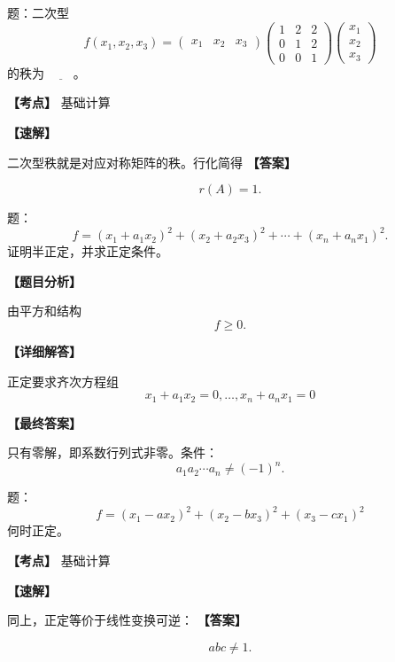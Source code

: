 ﻿\documentclass[11pt,a4paper,UTF8]{ctexart}
\begin{document}
\begin{answerbox}[2020--2021 填空 6]
题：二次型
\[
f(x_1,x_2,x_3)=
\begin{pmatrix}x_1&x_2&x_3\end{pmatrix}
\begin{pmatrix}
1&2&2\\
0&1&2\\
0&0&1
\end{pmatrix}
\begin{pmatrix}x_1\\x_2\\x_3\end{pmatrix}
\]
的秩为 $\underline{\qquad}$。

\textbf{【考点】} 基础计算

\textbf{【速解】}

二次型秩就是对应对称矩阵的秩。行化简得
\textbf{【答案】}

\[r(A)=1.\]
\end{answerbox}
\begin{answerbox}
题：
\[f=(x_1+a_1x_2)^2+(x_2+a_2x_3)^2+\cdots+(x_n+a_nx_1)^2.\]
证明半正定，并求正定条件。

\textbf{【题目分析】}

由平方和结构
\[f\ge0.\]

\textbf{【详细解答】}

正定要求齐次方程组
\[x_1+a_1x_2=0,\ldots,x_n+a_nx_1=0\]

\textbf{【最终答案】}

只有零解，即系数行列式非零。条件：
\[a_1a_2\cdots a_n\ne(-1)^n.\]
\end{answerbox}
\begin{answerbox}[2021--2022 填空 6]
题：
\[f=(x_1-ax_2)^2+(x_2-bx_3)^2+(x_3-cx_1)^2\]
何时正定。

\textbf{【考点】} 基础计算

\textbf{【速解】}

同上，正定等价于线性变换可逆：
\textbf{【答案】}

\[abc\ne 1.\]
\end{answerbox}
\end{document}
